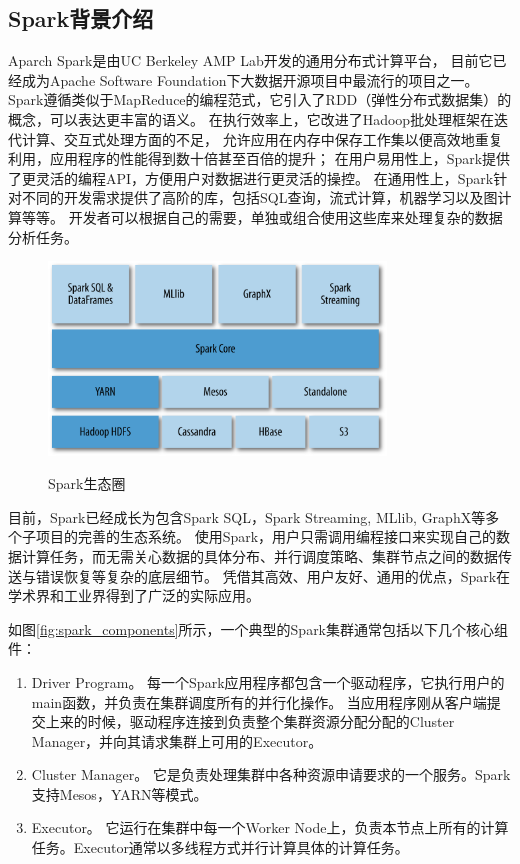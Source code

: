 \documentclass[master]{njuthesis}
\begin{document}
\subsection{Spark背景介绍}
Aparch Spark\cite{DBLP:conf/hotcloud/ZahariaCFSS10}是由UC Berkeley AMP Lab开发的通用分布式计算平台，
目前它已经成为Apache Software Foundation下大数据开源项目中最流行的项目之一。
Spark遵循类似于MapReduce的编程范式，它引入了RDD（弹性分布式数据集）的概念，可以表达更丰富的语义。
在执行效率上，它改进了Hadoop\cite{DBLP:conf/osdi/DeanG04}批处理框架在迭代计算、交互式处理方面的不足，
允许应用在内存中保存工作集以便高效地重复利用，应用程序的性能得到数十倍甚至百倍的提升；
在用户易用性上，Spark提供了更灵活的编程API，方便用户对数据进行更灵活的操控。
在通用性上，Spark针对不同的开发需求提供了高阶的库，包括SQL查询，流式计算，机器学习以及图计算等等。
开发者可以根据自己的需要，单独或组合使用这些库来处理复杂的数据分析任务。
\begin{figure}[h]
  \centering
  \includegraphics[width= 0.8\textwidth]{figure/spark_ssstack.png}\\
  \caption{Spark生态圈}
  \label{fig:spark_stack}
\end{figure}

目前，Spark已经成长为包含Spark SQL，Spark Streaming, MLlib, GraphX等多个子项目的完善的生态系统。
使用Spark，用户只需调用编程接口来实现自己的数据计算任务，而无需关心数据的具体分布、并行调度策略、集群节点之间的数据传送与错误恢复等复杂的底层细节。
凭借其高效、用户友好、通用的优点，Spark在学术界和工业界得到了广泛的实际应用。


如图\ref{fig:spark_components}所示，一个典型的Spark集群通常包括以下几个核心组件：
\begin{enumerate}
 \item Driver Program。 每一个Spark应用程序都包含一个驱动程序，它执行用户的main函数，并负责在集群调度所有的并行化操作。
当应用程序刚从客户端提交上来的时候，驱动程序连接到负责整个集群资源分配分配的Cluster Manager，并向其请求集群上可用的Executor。 
\item Cluster Manager。 它是负责处理集群中各种资源申请要求的一个服务。Spark支持Mesos，YARN等模式。
\item Executor。 它运行在集群中每一个Worker Node上，负责本节点上所有的计算任务。Executor通常以多线程方式并行计算具体的计算任务。

\end{enumerate}
\end{document}
